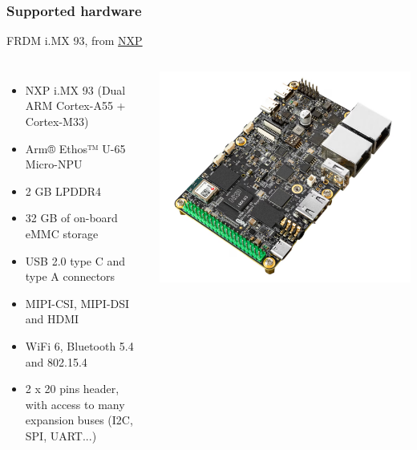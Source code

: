 \begin{frame}
\frametitle{Supported hardware}
  FRDM i.MX 93, from
\href{https://www.nxp.com/design/design-center/software/development-software/mcuxpresso-software-and-tools-/frdm-i-mx-93-development-board:FRDM-IMX93}{NXP}
  \begin{columns}
    \footnotesize
    \begin{itemize}
      \item NXP i.MX 93 (Dual ARM Cortex-A55 + Cortex-M33)
      \item Arm® Ethos™ U-65 Micro-NPU
      \item 2 GB LPDDR4
      \item 32 GB of on-board eMMC storage
      \item USB 2.0 type C and type A connectors
      \item MIPI-CSI, MIPI-DSI and HDMI
      \item WiFi 6, Bluetooth 5.4 and 802.15.4
      \item 2 x 20 pins header, with access to many expansion buses
        (I2C, SPI, UART...)
    \end{itemize}
    \begin{center}
      \includegraphics[width=\textwidth]{slides/imx93-frdm-board/imx93-frdm.png}\\
    \end{center}
  \end{columns}
\end{frame}
